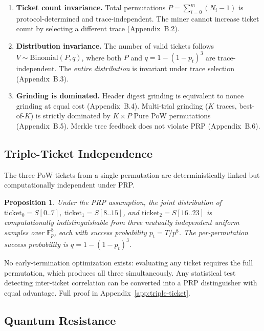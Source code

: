 \documentclass[11pt,a4paper]{article}
\newtheorem{proposition}{Proposition}
\begin{document}
\begin{enumerate}
\item \textbf{Ticket count invariance.} Total permutations $P = \sum_{i=0}^{m}(N_i - 1)$ is protocol-determined and trace-independent. The miner cannot increase ticket count by selecting a different trace (Appendix~B.2).

\item \textbf{Distribution invariance.} The number of valid tickets follows $V \sim \mathrm{Binomial}(P, q)$, where both $P$ and $q = 1 - (1-p_t)^3$ are trace-independent. The \emph{entire distribution} is invariant under trace selection (Appendix~B.3).

\item \textbf{Grinding is dominated.} Header digest grinding is equivalent to nonce grinding at equal cost (Appendix~B.4). Multi-trial grinding ($K$ traces, best-of-$K$) is strictly dominated by $K \times P$ Pure PoW permutations (Appendix~B.5). Merkle tree feedback does not violate PRP (Appendix~B.6).
\end{enumerate}

\subsection{Triple-Ticket Independence}
\label{sec:triple-ticket}

The three PoW tickets from a single permutation are deterministically linked but computationally independent under PRP.

\begin{proposition}
Under the PRP assumption, the joint distribution of $\mathrm{ticket}_0 = S[0..7]$, $\mathrm{ticket}_1 = S[8..15]$, and $\mathrm{ticket}_2 = S[16..23]$ is computationally indistinguishable from three mutually independent uniform samples over $\mathbb{F}_p^8$, each with success probability $p_t = T/p^8$. The per-permutation success probability is $q = 1 - (1-p_t)^3$.
\end{proposition}

No early-termination optimization exists: evaluating any ticket requires the full permutation, which produces all three simultaneously. Any statistical test detecting inter-ticket correlation can be converted into a PRP distinguisher with equal advantage. Full proof in Appendix~\ref{app:triple-ticket}.

\subsection{Quantum Resistance}
\end{document}
